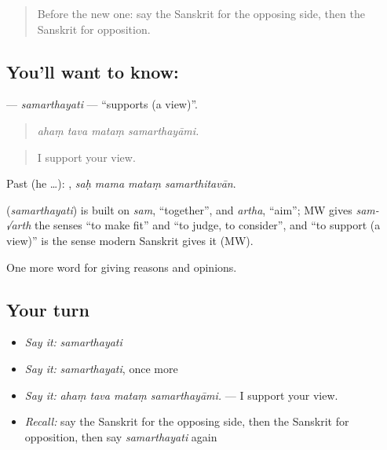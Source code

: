\label{lesson:SA-C344-samarthayati}



\begin{quote}
Before the new one: say the Sanskrit for the opposing side, then the Sanskrit for opposition.
\end{quote}

\subsection*{You'll want to know: }
\textbf{} — \emph{samarthayati} — \textquotedblleft{}supports (a view)\textquotedblright{}.

\begin{quote}
   
\end{quote}

\begin{quote}
\emph{ahaṃ tava mataṃ samarthayāmi.}
\end{quote}

\begin{quote}
I support your view.
\end{quote}

Past (he …):    , \emph{saḥ mama mataṃ samarthitavān}.

\begin{cousinweb}
\textbf{} (\emph{samarthayati}) is built on \emph{sam}, \textquotedblleft{}together\textquotedblright{}, and \emph{artha}, \textquotedblleft{}aim\textquotedblright{}; MW gives \emph{sam-√arth} the senses \textquotedblleft{}to make fit\textquotedblright{} and \textquotedblleft{}to judge, to consider\textquotedblright{}, and \textquotedblleft{}to support (a view)\textquotedblright{} is the sense modern Sanskrit gives it (MW).
\end{cousinweb}

\begin{grammarlens}[title={What you've built}]
One more word for giving reasons and opinions.
\end{grammarlens}

\subsection*{Your turn}
\begin{itemize}
\raggedright
  \item \emph{Say it:} \emph{samarthayati}
  \item \emph{Say it:} \emph{samarthayati}, once more
  \item \emph{Say it:} \emph{ahaṃ tava mataṃ samarthayāmi.} — I support your view.
  \item \emph{Recall:} say the Sanskrit for the opposing side, then the Sanskrit for opposition, then say \emph{samarthayati} again
\end{itemize}

